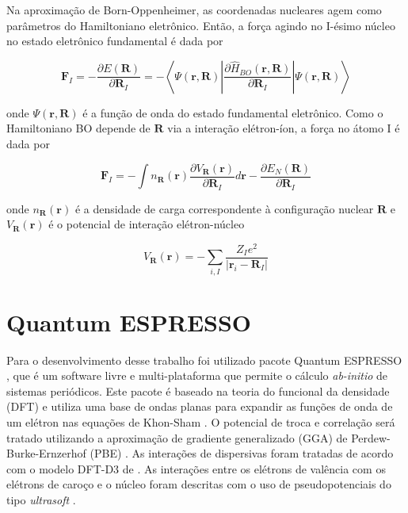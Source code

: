 		Na aproximação de Born-Oppenheimer, as coordenadas nucleares agem como parâmetros do Hamiltoniano eletrônico. Então, a força agindo no I-ésimo núcleo no estado eletrônico fundamental é dada por
		
		\begin{equation}
			\mathbf{F}_I = -\frac{\partial E(\mathbf{R})}{\partial \mathbf{R}_I} = -  \left\langle \Psi(\mathbf{r}, \mathbf{R})\left| \frac{\partial \hat{H}_{BO}(\mathbf{r}, \mathbf{R})}{\partial \mathbf{R}_I}\right|\Psi(\mathbf{r},\mathbf{R}) \right\rangle
		\end{equation}
		
		onde $\Psi(\mathbf{r},\mathbf{R})$ é a função de onda do estado fundamental eletrônico. Como o Hamiltoniano BO depende de $\textbf{R}$ via a interação elétron-íon, a força no átomo I é dada por
		
		\begin{equation}
			\mathbf{F}_I =- \int n_\mathbf{R}(\mathbf{r})\frac{\partial V_\mathbf{R}(\mathbf{r})}{\partial\mathbf{R}_I}d\mathbf{r} -\frac{\partial E_N(\mathbf{R})}{\partial \mathbf{R}_I} 
		\end{equation}
		
		onde $n_\mathbf{R}(\mathbf{r})$ é a densidade de carga correspondente à configuração nuclear $\mathbf{R}$ e $V_\mathbf{R}(\mathbf{r})$ é o potencial de interação elétron-núcleo
		
		\begin{equation}
			V_\mathbf{R}(\mathbf{r}) = -\sum_{i,I} \frac{Z_Ie^2}{|\mathbf{r}_i - \mathbf{R}_I|}
		\end{equation}
		
   	
\section{Quantum ESPRESSO}

	Para o desenvolvimento desse trabalho foi utilizado pacote Quantum ESPRESSO \cite{giannozzi2009quantum, giannozzi2017advanced}, que é um software livre e multi-plataforma que permite o cálculo \textit{ab-initio} de sistemas periódicos.  Este pacote é baseado na teoria do funcional da densidade (DFT) e utiliza uma base de ondas planas para expandir as funções de onda de um elétron nas equações de Khon-Sham \cite{hohenberg1964inhomogeneous, kohn1965self}. O potencial de troca e correlação será tratado utilizando a aproximação de gradiente generalizado (GGA) de Perdew-Burke-Ernzerhof (PBE) \cite{perdew1996generalized}. As interações de dispersivas foram tratadas de acordo com o modelo DFT-D3 de  \cite{grimme2010consistent}. As interações entre os elétrons de valência com os elétrons de caroço e o núcleo foram descritas com o uso de pseudopotenciais do tipo \textit{ultrasoft} \cite{vanderbilt1990soft}. 
	
